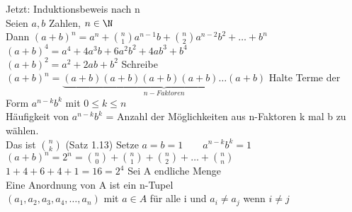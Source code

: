 Jetzt: Induktionsbeweis nach n\\[4pt]
%
Seien $a,b$ Zahlen, $n\in\N$\\
Dann $(a+b)^n=a^n+\binom{n}{1} a^{n-1} b+\binom{n}{2}a^{n-2}b^2+…+b^n$
%
\bsp
$(a+b)^4=a^4+4a^3b+6a^2b^2+4ab^3+b^4$\\
$(a+b)^2=a^2+2ab+b^2$
%
\bew
Schreibe $(a+b)^n=\underbrace{(a+b)(a+b)(a+b)(a+b)…(a+b)}_{n-Faktoren}$
%
Halte Terme der Form $a^{n-k}b^k$ mit $0\leq k\leq n$\\
Häufigkeit von $a^{n-k}b^k$ = Anzahl der Möglichkeiten aus n-Faktoren k mal b zu wählen.\\
Das ist $\binom{n}{k}$ (Satz 1.13)
%
Setze $a=b=1\qquad a^{n-k}b^k=1$\\
$(a+b)^n=2^n=\binom{n}{0}+\binom{n}{1}+\binom{n}{2}+…+\binom{n}{n}$\\
%
\bsp
$1+4+6+4+1=16=2^4$
%
Sei A endliche Menge\\
Eine Anordnung von A ist ein n-Tupel\\
$(a_1,a_2,a_3,a_4,…,a_n)$ mit $a\in A$ für alle i und $a_i\neq a_j$ wenn $i\neq j$\\

